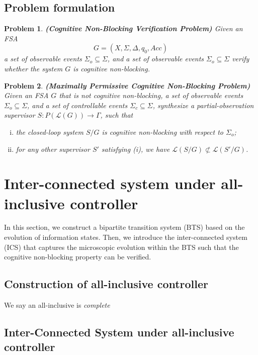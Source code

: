 \documentclass{article}
\newtheorem{problem}{Problem}           %
\begin{document}
\subsection{Problem formulation}

\begin{problem}
\textbf{(Cognitive Non-Blocking Verification Problem)}
Given an FSA 
$$
G = (X, \Sigma, \Delta, q_0, Acc)
$$ 
a set of observable events $\Sigma_o \subseteq \Sigma$, and a set of observable events $\Sigma_o \subseteq \Sigma$
verify whether the system $G$ is cognitive non-blocking.
\end{problem}

\begin{problem}
\textbf{(Maximally Permissive Cognitive Non-Blocking Problem)} 
Given an FSA $G$ that is not cognitive non-blocking, a set of observable events $\Sigma_o \subseteq \Sigma$,
and a set of controllable events $\Sigma_c \subseteq \Sigma$, synthesize a partial-observation supervisor $S : P(\mathcal{L}(G)) \rightarrow \Gamma$, such that
\begin{enumerate}[(i)]
    \item the closed-loop system $S / G$ is cognitive non-blocking with respect to $\Sigma_o$;
    \item for any other supervisor $S'$ satisfying (i), we have $\mathcal{L}(S/G) \not \subset \mathcal{L}(S'/G)$.
\end{enumerate}
\end{problem}


\section{Inter-connected system under all-inclusive controller}

In this section, we construct a bipartite transition system (BTS) based on the evolution of information states. 
Then, we introduce the inter-connected system (ICS) that captures the microscopic evolution within the BTS such that the cognitive non-blocking property can be verified.

\subsection{Construction of all-inclusive controller}

We say an all-inclusive is \textit{complete}

\subsection{Inter-Connected System under all-inclusive controller}
\end{document}
